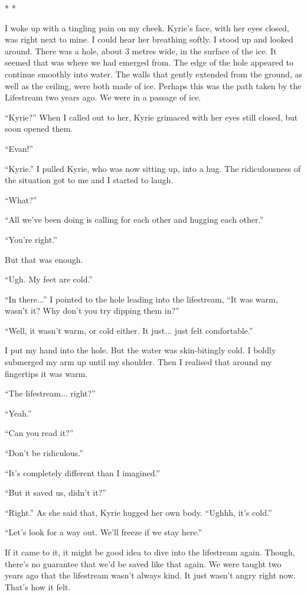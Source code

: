\documentclass[oneside]{book}
\begin{document}
* *

I woke up with a tingling pain on my cheek. Kyrie’s face, with her eyes closed, was right next to mine. I could hear her breathing softly. I stood up and looked around. There was a hole, about 3 metres wide, in the surface of the ice. It seemed that was where we had emerged from. The edge of the hole appeared to continue smoothly into water. The walls that gently extended from the ground, as well as the ceiling, were both made of ice. Perhaps this was the path taken by the Lifestream two years ago. We were in a passage of ice.

“Kyrie?” When I called out to her, Kyrie grimaced with her eyes still closed, but soon opened them.

“Evan!”

“Kyrie.” I pulled Kyrie, who was now sitting up, into a hug. The ridiculousness of the situation got to me and I started to laugh.

“What?”

“All we’ve been doing is calling for each other and hugging each other.”

“You’re right.”

But that was enough.

“Ugh. My feet are cold.”

“In there...” I pointed to the hole leading into the lifestream, “It was warm, wasn’t it? Why don’t you try dipping them in?”

“Well, it wasn’t warm, or cold either. It just... just felt comfortable.”

I put my hand into the hole. But the water was skin-bitingly cold. I boldly submerged my arm up until my shoulder. Then I realised that around my fingertips it was warm.

“The lifestream... right?”

“Yeah.”

“Can you read it?”

“Don’t be ridiculous.”

“It’s completely different than I imagined.”

“But it saved us, didn’t it?”

“Right.” As she said that, Kyrie hugged her own body. “Ughhh, it’s cold.”

“Let’s look for a way out. We’ll freeze if we stay here.”

If it came to it, it might be good idea to dive into the lifestream again. Though, there’s no guarantee that we’d be saved like that again. We were taught two years ago that the lifestream wasn’t always kind. It just wasn’t angry right now. That’s how it felt.
\end{document}
